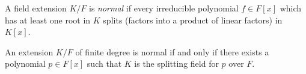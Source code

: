 \documentclass{article}
\begin{document}
A field extension $K/F$ is \emph{normal} if every irreducible polynomial $f \in F[x]$ which has at least one root in $K$ splits (factors into a product of linear factors) in $K[x]$.

An extension $K/F$ of finite degree is normal if and only if there exists a polynomial $p \in F[x]$ such that $K$ is the splitting field for $p$ over $F$.
\end{document}
